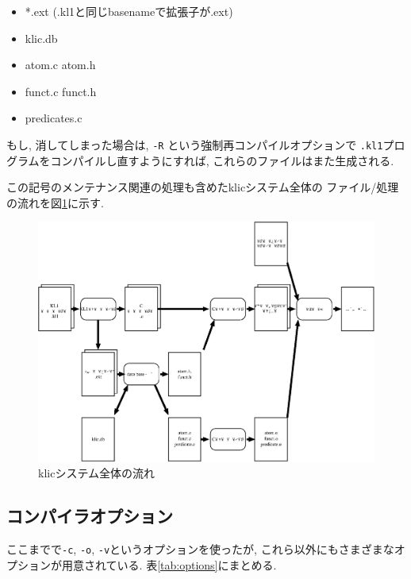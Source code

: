\documentclass[a4,titlepage]{jsreport}
\begin{document}
\begin{itemize}
\item *.ext (.kl1と同じbasenameで拡張子が.ext)
\item klic.db
\item atom.c atom.h
\item funct.c funct.h
\item predicates.c
\end{itemize}

もし, 消してしまった場合は, {\tt -R} という強制再コンパイルオプションで
\verb|.kl1|プログラムをコンパイルし直すようにすれば, 
これらのファイルはまた生成される.  

この記号のメンテナンス関連の処理も含めたklicシステム全体の
ファイル/処理の流れを図\ref{fig:flow2}に示す.  

\begin{figure}
\begin{center}
\includegraphics[width=.9\textwidth]{fig/klicflow2.eps}
\end{center}
\caption{klicシステム全体の流れ}
\label{fig:flow2}
\end{figure}

\subsection{コンパイラオプション}
ここまでで\verb|-c|, \verb|-o|, \verb|-v|というオプションを使ったが, 
これら以外にもさまざまなオプションが用意されている.  
表\ref{tab:options}にまとめる.  
\end{document}
